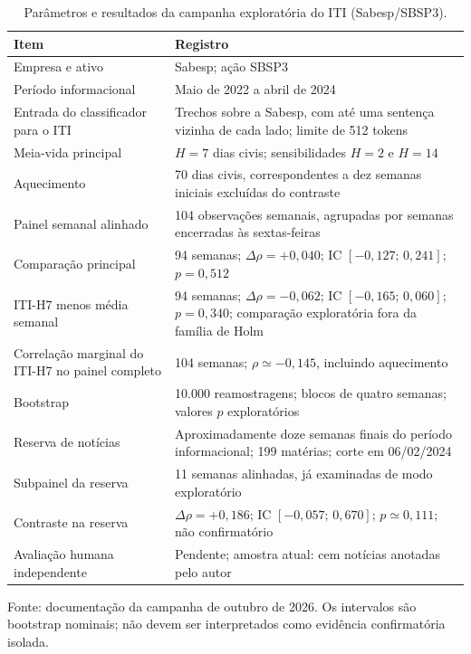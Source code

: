 \begin{table}[!htbp]
\centering
\caption{Parâmetros e resultados da campanha exploratória do ITI (Sabesp/SBSP3).}
\label{tab:rastreabilidade}
\begin{tabularx}{\textwidth}{@{}P{0.35\textwidth}L@{}}
\toprule
Item & Registro \\
\midrule
Empresa e ativo & Sabesp; ação SBSP3 \\
Período informacional & Maio de 2022 a abril de 2024 \\
Entrada do classificador para o ITI & Trechos sobre a Sabesp, com até uma sentença vizinha de cada lado; limite de 512 tokens \\
Meia-vida principal & $H=7$ dias civis; sensibilidades $H=2$ e $H=14$ \\
Aquecimento & 70 dias civis, correspondentes a dez semanas iniciais excluídas do contraste \\
Painel semanal alinhado & 104 observações semanais, agrupadas por semanas encerradas às sextas-feiras \\
Comparação principal & 94 semanas; $\Delta\rho=+0{,}040$; IC $[-0{,}127;\,0{,}241]$; $p=0{,}512$ \\
ITI-H7 menos média semanal & 94 semanas; $\Delta\rho=-0{,}062$; IC $[-0{,}165;\,0{,}060]$; $p=0{,}340$; comparação exploratória fora da família de Holm \\
Correlação marginal do ITI-H7 no painel completo & 104 semanas; $\rho\simeq-0{,}145$, incluindo aquecimento \\
Bootstrap & 10.000 reamostragens; blocos de quatro semanas; valores $p$ exploratórios \\
Reserva de notícias & Aproximadamente doze semanas finais do período informacional; 199 matérias; corte em 06/02/2024 \\
Subpainel da reserva & 11 semanas alinhadas, já examinadas de modo exploratório \\
Contraste na reserva & $\Delta\rho=+0{,}186$; IC $[-0{,}057;\,0{,}670]$; $p\simeq0{,}111$; não confirmatório \\
Avaliação humana independente & Pendente; amostra atual: cem notícias anotadas pelo autor \\
\bottomrule
\end{tabularx}
\par\smallskip
{\footnotesize Fonte: documentação da campanha de outubro de 2026. Os intervalos são bootstrap nominais; não devem ser interpretados como evidência confirmatória isolada.}
\end{table}

